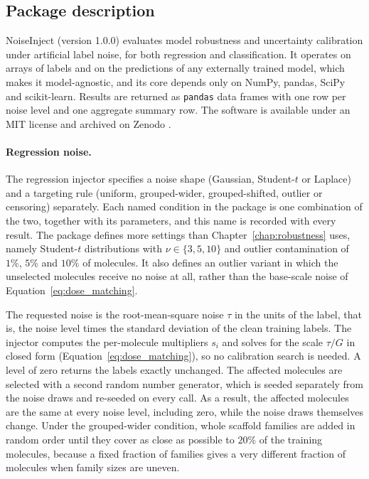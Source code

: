 \subsection{Package description}\label{sec:noiseinject_pkg} %

NoiseInject (version 1.0.0) evaluates model robustness and uncertainty calibration under artificial
label noise, for both regression and classification. It operates on arrays of labels and on the
predictions of any externally trained model, which makes it model-agnostic, and its core depends only
on NumPy, pandas, SciPy and scikit-learn. Results are returned as \texttt{pandas} data frames with one
row per noise level and one aggregate summary row. The software is available under an MIT license
and archived on Zenodo \citep{noiseinject}.

\paragraph{Regression noise.} The regression injector specifies a noise shape (Gaussian, Student-$t$ or
Laplace) and a targeting rule (uniform, grouped-wider, grouped-shifted, outlier or censoring)
separately. Each named condition in the package is one combination of the two, together with its
parameters, and this name is recorded with every result. The package defines more settings
than Chapter~\ref{chap:robustness} uses, namely Student-$t$ distributions with $\nu \in \{3, 5, 10\}$ and outlier contamination of $1\%$,
$5\%$ and $10\%$ of molecules. It also defines an outlier variant in which the unselected molecules receive no
noise at all, rather than the base-scale noise of Equation~\ref{eq:dose_matching}.

The requested noise is the root-mean-square noise $\tau$ in the units of the label, that is, the noise level times the standard deviation of the clean training labels. The
injector computes the per-molecule multipliers $s_i$ and solves for the scale $\tau / G$ in closed
form (Equation~\ref{eq:dose_matching}), so no calibration search is needed. A level of zero returns the
labels exactly unchanged. The affected molecules are selected with a second random number generator,
which is seeded separately from the noise draws and re-seeded on every call. As a result, the affected molecules are
the same at every noise level, including zero, while the noise draws themselves change. Under the
grouped-wider condition, whole scaffold families are added in random order until they cover as close as possible
to $20\%$ of the training molecules, because a fixed fraction of families
gives a very different fraction of molecules when family sizes are uneven.

